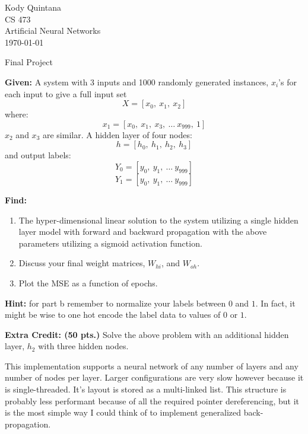 \documentclass[14pt]{article}
\begin{document}
\begin{flushleft}
 
\large
Kody Quintana\\
CS 473\\
Artificial Neural Networks\\
\today\\
\boldmath

\begin{center}
Final Project
\end{center}

\question
\textbf{Given:}
	A system with 3 inputs and 1000 randomly generated instances, $x_i$'s
	for each input to give a full input set
		\[X = [x_0,\ x_1,\ x_2] \]
	where:
		\[x_1 = [x_0,\ x_1,\ x_3,\ \ldots \ x_{999},\ 1]\]
		$x_2$ and $x_3$ are similar.
	A hidden layer of four nodes:
		\[h = [h_0,\ h_1,\ h_2,\ h_3]\]
	and output labels:
		\[Y_0 = [y_0, \ y_1, \ \ldots \ y_{999}] \]
		\[Y_1 = [y_0, \ y_1, \ \ldots \ y_{999}] \]
	
\textbf{Find:}
	\begin{enumerate}
	\item The hyper-dimensional linear solution to the system utilizing a single hidden layer model
		with forward and backward propagation with the above parameters
		utilizing a sigmoid activation function.
	\item Discuss your final weight matrices, $W_{hi}$, and $W_{oh}$.
	\item Plot the MSE as a function of epochs.
	\end{enumerate}

\textbf{Hint:}
	for part b remember to normalize your labels between $0$ and $1$.
	In fact, it might be wise to one hot encode the label data to values of $0$ or $1$.
\closequestion

\question
\textbf{Extra Credit: (50 pts.)}
	Solve the above problem with an additional hidden layer, $h_2$ with three hidden nodes.
\closequestion

\newpage


\immediate{}

This implementation supports a neural network of any number of layers and any number of nodes per layer.
Larger configurations are very slow however because it is single-threaded.
It's layout is stored as a multi-linked list.		
This structure is probably less performant because of all the required pointer dereferencing,
but it is the most simple way I could think of to implement generalized back-propagation.


\end{flushleft}
\end{document}
